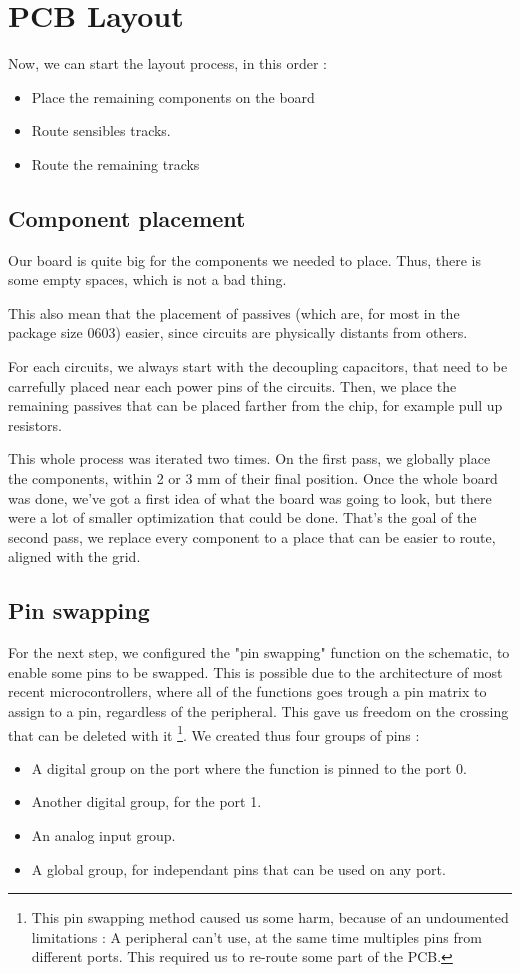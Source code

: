 \section{PCB Layout}
Now, we can start the layout process, in this order :

\begin{itemize}
    \item   Place the remaining components on the board
    \item   Route sensibles tracks.
    \item   Route the remaining tracks
\end{itemize}

\subsection{Component placement}
Our board is quite big for the components we needed to place. Thus, there is some empty spaces,
which is not a bad thing.

This also mean that the placement of passives (which are, for most in the package size 0603)
easier, since circuits are physically distants from others.

For each circuits, we always start with the decoupling capacitors, that need to be carrefully
placed near each power pins of the circuits. Then, we place the remaining passives that can
be placed farther from the chip, for example pull up resistors.

This whole process was iterated two times. On the first pass, we globally place the components,
within 2 or 3 mm of their final position. Once the whole board was done, we've got a first idea
of what the board was going to look, but there were a lot of smaller optimization that could be
done. That's the goal of the second pass, we replace every component to a place that can be easier
to route, aligned with the grid.

\subsection{Pin swapping}
For the next step, we configured the "pin swapping" function on the schematic, to enable some pins
to be swapped. This is possible due to the architecture of most recent microcontrollers, where all
of the functions goes trough a pin matrix to assign to a pin, regardless of the peripheral. This
gave us freedom on the crossing that can be deleted with it \footnote{
    This pin swapping method caused us some harm, because of an undoumented limitations : A
    peripheral can't use, at the same time multiples pins from different ports. This required
    us to re-route some part of the PCB.
}.
We created thus four groups of pins :
\begin{itemize}
    \item   A digital group on the port where the function is pinned to the port 0.
    \item   Another digital group, for the port 1.
    \item   An analog input group.
    \item   A global group, for independant pins that can be used on any port.
\end{itemize}

